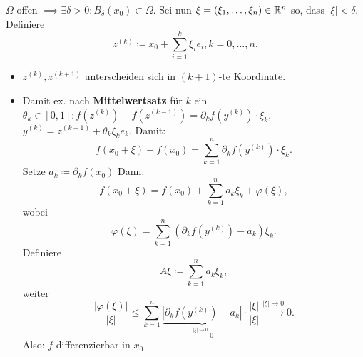 \begin{proof*}
	$ \Omega $ offen $ \implies \exists \delta > 0: B_{\delta}(x_0) \subset \Omega $.
	Sei nun $ \xi = \left( \xi_1, \dotsc, \xi_n \right) \in \mathbb{R} ^n $ so, dass $ \left| \xi \right| < \delta $.
	Definiere
	\[
		z^{(k)} \coloneqq  x_0 + \sum_{i=1}^{k} \xi_i e_i, k = 0, \dotsc, n.
	\]
	\begin{itemize}
		\item $ z^{(k)} , z^{(k + 1)}  $ unterscheiden sich in $ (k+1) $-te Koordinate.
		\item Damit ex. nach \textbf{Mittelwertsatz} für $ k $ ein $ \theta_k \in [0, 1] : f\left( z^{(k)} \right) - f\left( z^{(k - 1)} \right) = \partial_k f(y^{(k)} ) \cdot \xi_k $, $ y^{(k)} = z^{(k - 1)} + \theta_k \xi_k e_k $.
			Damit:
			\[
				f(x_0 + \xi) - f(x_0) = \sum_{k=1}^{n} \partial_k f\left( y^{(k)}  \right) \cdot \xi_k.
			\]
			Setze $ a_k \coloneqq  \partial_k f(x_0) $ 
			Dann:
			\[
				f\left( x_0 + \xi \right) = f(x_0) + \sum_{k=1}^{n} a_k \xi_k + \varphi(\xi),
			\]
			wobei
			\[
				\varphi(\xi) = \sum_{k=1}^{n} \left( \partial_k f\left( y^{(k)}  \right) - a_k \right) \xi_k.
			\]
			Definiere
			\[
				A\xi \coloneqq \sum_{k=1}^{n} a_k\xi_k,
			\]
			weiter
			\[
				\frac{ \left| \varphi(\xi) \right| }{ \left| \xi \right|  } \leq \sum_{k=1}^{n} \underbrace{\left| \partial_k f \left( y^{(k)}  \right) - a_k \right| }_{\overset{\left| \xi \right| \to 0}{\longrightarrow} 0} \cdot \frac{ \left| \xi \right| }{ \left| \xi \right|  } \overset{\left| \xi \right| \to 0}{\longrightarrow} 0.
			\]
			Also: $ f $ differenzierbar in $ x_0 $
	\end{itemize}
	
\end{proof*}

